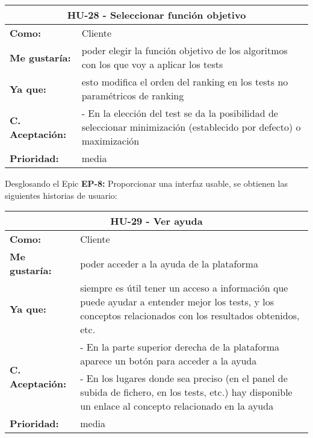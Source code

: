 
\begin{table}[H]
	\begin{tabular}{| p{3cm}| p{11cm} |}
		\hline
		\multicolumn{2}{|c|}{\textbf{HU-28} - Seleccionar función objetivo} \\ \hline
		\textbf{Como:} & Cliente \\ \hline
		\textbf{Me gustaría:} & poder elegir la función objetivo de los algoritmos con los que voy a aplicar los tests \\ \hline
		\textbf{Ya que:} & esto modifica el orden del ranking en los tests no paramétricos de ranking \\ \hline
		\textbf{C. Aceptación:} & - En la elección del test se da la posibilidad de seleccionar minimización (establecido por defecto) o maximización  \\ \hline
		\textbf{\textbf{Prioridad:}} & media \\ \hline
	\end{tabular}
\end{table}


\clearpage
Desglosando el Epic \textbf{EP-8:} Proporcionar una interfaz usable, se obtienen las siguientes historias de usuario:

\begin{table}[H]
	\begin{tabular}{| p{3cm}| p{11cm} |}
		\hline
		\multicolumn{2}{|c|}{\textbf{HU-29} - Ver ayuda} \\ \hline
		\textbf{Como:} & Cliente \\ \hline
		\textbf{Me gustaría:} & poder acceder a la ayuda de la plataforma \\ \hline
		\textbf{Ya que:} & siempre es útil tener un acceso a información que puede ayudar a entender mejor los tests, y los conceptos relacionados con los resultados obtenidos, etc. \\ \hline
		\multirow{2}{11cm}{\textbf{C. Aceptación:}} & - En la parte superior derecha de la plataforma aparece un botón para acceder a la ayuda \\
		& - En los lugares donde sea preciso (en el panel de subida de fichero, en los tests, etc.) hay disponible un enlace al concepto relacionado en la ayuda \\ \hline
		\textbf{\textbf{Prioridad:}} & media \\ \hline
	\end{tabular}
\end{table}

